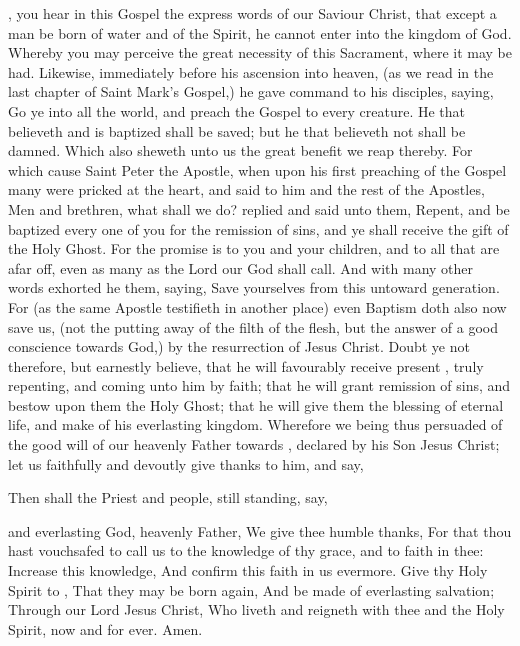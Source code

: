 , you hear in this Gospel the express words of our Saviour Christ, that except a man be born of water and of the Spirit, he cannot enter into the kingdom of God.
Whereby you may perceive the great necessity of this Sacrament, where it may be had.
Likewise, immediately before his ascension into heaven, (as we read in the last chapter of Saint Mark's Gospel,) he gave command to his disciples, saying, Go ye into all the world, and preach the Gospel to every creature.
He that believeth and is baptized shall be saved; but he that believeth not shall be damned.
Which also sheweth unto us the great benefit we reap thereby.
For which cause Saint Peter the Apostle, when upon his first preaching of the Gospel many were pricked at the heart, and said to him and the rest of the Apostles, Men and brethren, what shall we do?
replied and said unto them, Repent, and be baptized every one of you for the remission of sins, and ye shall receive the gift of the Holy Ghost.
For the promise is to you and your children, and to all that are afar off, even as many as the Lord our God shall call.
And with many other words exhorted he them, saying, Save yourselves from this untoward generation.
For (as the same Apostle testifieth in another place) even Baptism doth also now save us, (not the putting away of the filth of the flesh, but the answer of a good conscience towards God,) by the resurrection of Jesus Christ.
Doubt ye not therefore, but earnestly believe, that he will favourably receive  present , truly repenting, and coming unto him by faith; that he will grant  remission of  sins, and bestow upon them the Holy Ghost; that he will give them the blessing of eternal life, and make  of his everlasting kingdom.
Wherefore we being thus persuaded of the good will of our heavenly Father towards , declared by his Son Jesus Christ; let us faithfully and devoutly give thanks to him, and say,

\begin{leftbar}
\begin{rubric}
Then shall the Priest and people, still standing, say,
\end{rubric}
\end{leftbar}

 and everlasting God, heavenly Father, We give thee humble thanks, For that thou hast vouchsafed to call us to the knowledge of thy grace, and to faith in thee:
Increase this knowledge, And confirm this faith in us evermore.
Give thy Holy Spirit to , That they may be born again, And be made  of everlasting salvation; Through our Lord Jesus Christ, Who liveth and reigneth with thee and the Holy Spirit, now and for ever.
Amen.

